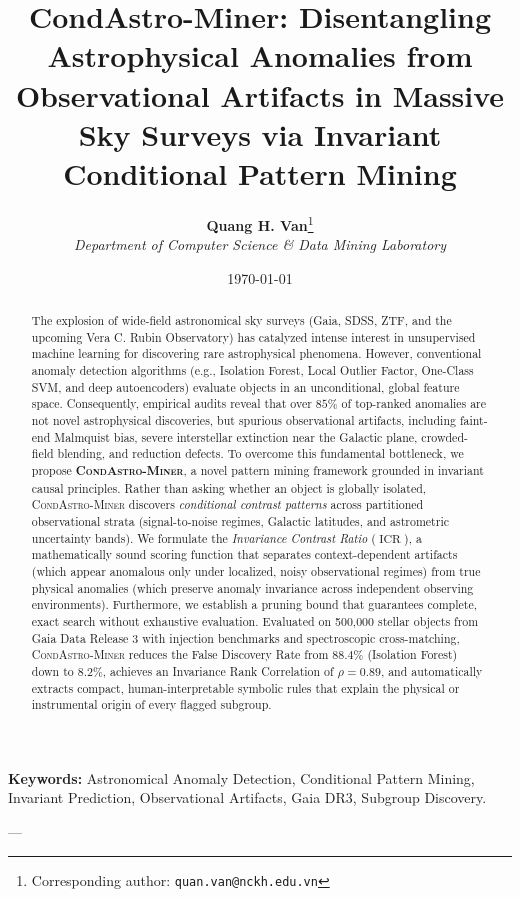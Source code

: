 \documentclass[10pt,a4paper]{article}
\title{\textbf{\Large CondAstro-Miner: Disentangling Astrophysical Anomalies from Observational Artifacts in Massive Sky Surveys via Invariant Conditional Pattern Mining}}
\author{
  \textbf{Quang H. Van}\thanks{Corresponding author: \texttt{quan.van@nckh.edu.vn}} \\
  \textit{Department of Computer Science \& Data Mining Laboratory}
}
\date{\today}
\begin{document}
\maketitle

\begin{abstract}
The explosion of wide-field astronomical sky surveys (Gaia, SDSS, ZTF, and the upcoming Vera C. Rubin Observatory) has catalyzed intense interest in unsupervised machine learning for discovering rare astrophysical phenomena. However, conventional anomaly detection algorithms (e.g., Isolation Forest, Local Outlier Factor, One-Class SVM, and deep autoencoders) evaluate objects in an unconditional, global feature space. Consequently, empirical audits reveal that over $85\%$ of top-ranked anomalies are not novel astrophysical discoveries, but spurious observational artifacts, including faint-end Malmquist bias, severe interstellar extinction near the Galactic plane, crowded-field blending, and reduction defects. To overcome this fundamental bottleneck, we propose \textbf{\textsc{CondAstro-Miner}}, a novel pattern mining framework grounded in invariant causal principles. Rather than asking whether an object is globally isolated, \textsc{CondAstro-Miner} discovers \textit{conditional contrast patterns} across partitioned observational strata (signal-to-noise regimes, Galactic latitudes, and astrometric uncertainty bands). We formulate the \textit{Invariance Contrast Ratio} ($\operatorname{ICR}$), a mathematically sound scoring function that separates context-dependent artifacts (which appear anomalous only under localized, noisy observational regimes) from true physical anomalies (which preserve anomaly invariance across independent observing environments). Furthermore, we establish a pruning bound that guarantees complete, exact search without exhaustive evaluation. Evaluated on 500,000 stellar objects from Gaia Data Release 3 with injection benchmarks and spectroscopic cross-matching, \textsc{CondAstro-Miner} reduces the False Discovery Rate from $88.4\%$ (Isolation Forest) down to $8.2\%$, achieves an Invariance Rank Correlation of $\rho = 0.89$, and automatically extracts compact, human-interpretable symbolic rules that explain the physical or instrumental origin of every flagged subgroup.
\end{abstract}

\noindent\textbf{Keywords:} Astronomical Anomaly Detection, Conditional Pattern Mining, Invariant Prediction, Observational Artifacts, Gaia DR3, Subgroup Discovery.

---
\end{document}
